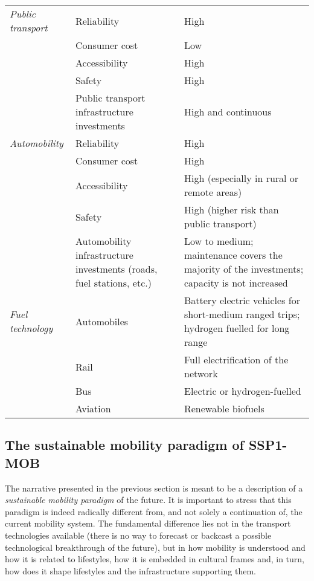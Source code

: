 \begin{table}
\begin{tabular}{p{2.5cm}p{3cm}p{8cm}}
\textit{Public transport} & Reliability & High \\
 & Consumer cost & Low \\
 & Accessibility & High \\
 & Safety & High \\
 & Public transport infrastructure investments & High and continuous \\\addlinespace
\textit{Automobility} & Reliability & High \\
 & Consumer cost & High \\
 & Accessibility & High (especially in rural or remote areas) \\
 & Safety & High (higher risk than public transport) \\
 & Automobility infrastructure investments (roads, fuel stations, etc.) & Low to medium; maintenance covers the majority of the investments; capacity is not increased \\\addlinespace 
\textit{Fuel technology} & Automobiles & Battery electric vehicles for short-medium ranged trips; hydrogen fuelled for long range \\
 & Rail & Full electrification of the network \\
 & Bus & Electric or hydrogen-fuelled \\
 & Aviation & Renewable biofuels \\ \bottomrule
\end{tabular}
\end{table}

\subsection{The sustainable mobility paradigm of SSP1-MOB}
\label{ss:results:ssp1-mob-paradigm}

The narrative presented in the previous section is meant to be a description of a \emph{sustainable mobility paradigm} of the future. It is important to stress that this paradigm is indeed radically different from, and not solely a continuation of, the current mobility system. The fundamental difference lies not in the transport technologies available (there is no way to forecast or backcast a possible technological breakthrough of the future), but in how mobility is understood and how it is related to lifestyles, how it is embedded in cultural frames and, in turn, how does it shape lifestyles and the infrastructure supporting them.

